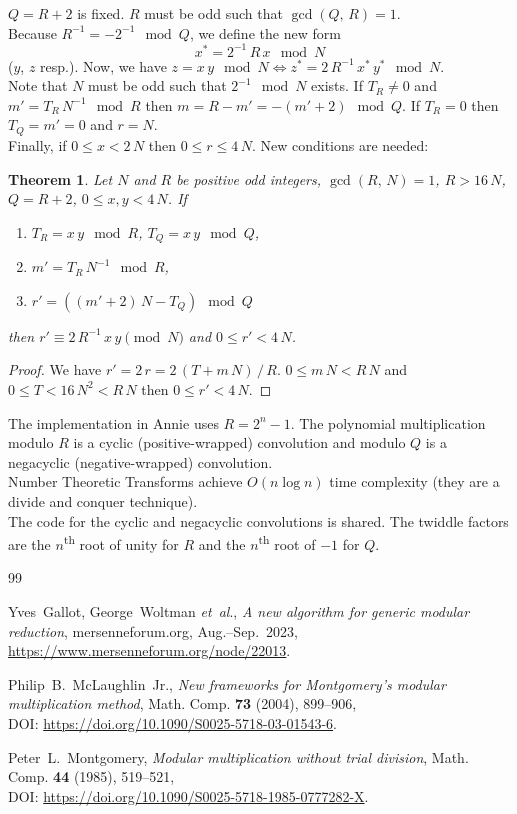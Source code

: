 \documentclass[a4paper, 12pt, pdftex]{article}
\theoremstyle{plain}
\newtheorem{theorem}{Theorem}
\theoremstyle{definition}
\begin{document}
$Q = R + 2$ is fixed. $R$ must be odd such that $\gcd(Q,\, R) = 1$.\\
Because $R^{-1} = -2^{-1} \mod Q$, we define the new form
$$x^* = 2^{-1}\,R\, x \mod N$$
($y$, $z$ resp.). Now, we have
$z = x\,y\mod N \Leftrightarrow z^*= 2\,R^{-1}\, x^*\,y^* \mod N$.\\
Note that $N$ must be odd such that $2^{-1} \mod N$ exists.
If $T_R \neq 0$ and $m' = T_R\,N^{-1} \mod R$ then $m = R - m' = -(m' + 2) \mod Q$. If $T_R = 0$ then $T_Q = m' = 0$ and $r = N$.\\
Finally, if $0 \leq x < 2\,N$ then $0 \leq r \leq 4\,N$. New conditions are
needed:
\begin{theorem}
Let $N$ and $R$ be positive odd integers, $\gcd(R,\, N) = 1$, $R > 16\,N$,
$Q = R + 2$, $0 \leq x, y < 4\,N$. If
\begin{enumerate}[label={(\arabic*)}]
\item $T_R = x\,y \mod R$, $T_Q = x\,y \mod Q$,
\item $m' = T_R\,N^{-1} \mod R$,
\item $r' = \left((m' + 2)\, N - T_Q\right) \mod Q$
\end{enumerate}
then $r' \equiv 2\,R^{-1}\,x\,y \pmod N$ and $0 \leq r' < 4\,N$.
\end{theorem}
\begin{proof}
We have $r' = 2\,r = 2\,(T + m\, N)\, /\, R$.
$0 \leq m\, N < R\, N$ and $0 \leq T < 16\,N^2 < R\, N$ then $0 \leq r' < 4\,N$.
\end{proof}

\medskip

The implementation in Annie uses $R = 2^n - 1$. The polynomial multiplication modulo $R$ is a cyclic  (positive-wrapped) convolution and modulo $Q$ is a negacyclic (negative-wrapped) convolution.\\
Number Theoretic Transforms achieve $O(n \log n)$ time complexity (they are a divide and conquer technique).\\
The code for the cyclic and negacyclic convolutions is shared. The twiddle factors are the $n$\textsuperscript{th} root of unity for $R$ and the $n$\textsuperscript{th} root of $-1$ for $Q$.


\begin{thebibliography}{99}

 Yves~Gallot, George~Woltman \textit{et~al}., \emph{A new algorithm for generic modular reduction}, mersenneforum.org, Aug.--Sep.~2023,\\ \url{https://www.mersenneforum.org/node/22013}.

 Philip~B.~McLaughlin~Jr., \emph{New frameworks for Montgomery’s modular multiplication method}, Math. Comp. \textbf{73} (2004), 899--906,\\ DOI: \url{https://doi.org/10.1090/S0025-5718-03-01543-6}.

 Peter~L.~Montgomery, \emph{Modular multiplication without trial division}, Math. Comp. \textbf{44} (1985), 519--521,\\ DOI: \url{https://doi.org/10.1090/S0025-5718-1985-0777282-X}.


\end{thebibliography}
\end{document}
